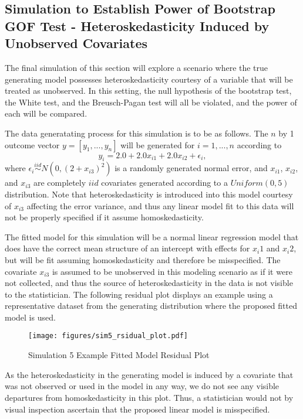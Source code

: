 		\subsection{Simulation to Establish Power of Bootstrap GOF Test - Heteroskedasticity Induced by Unobserved Covariates}

		The final simulation of this section will explore a scenario where the true generating model possesses heteroskedasticity courtesy of a variable that will be
		treated as unobserved. In this setting, the null hypothesis of the bootstrap test, the White test, and the Breusch-Pagan test will all be violated, and the
		power of each will be compared.

		The data generatating process for this simulation is to be as follows. The $n$ by 1 outcome vector $y = [y_1,...,y_n]$ will be generated for $i = 1,...,n$ according
		to
		\begin{equation}
			y_i = 2.0 + 2.0 x_{i1} + 2.0 x_{i2} + \epsilon_i , 
		\end{equation}
		where $\epsilon_i \stackrel{iid}{\sim} N \left( 0,(2 + x_{i3})^2 \right)$ is a randomly generated normal error, and $x_{i1}$, $x_{i2}$, and $x_{i3}$ are completely $iid$ covariates
		generated according to a $Uniform(0,5)$ distribution. Note that heteroskedasticity is introduced into this model courtesy of $x_{i3}$ affecting the error variance, and thus any
		linear model fit to this data will not be properly specified if it assume homoskedasticity.
		
		The fitted model for this simulation will be a normal linear regression model that does have the correct mean structure of an intercept with effects for $x_i1$ and $x_i2$, but will
		be fit assuming homoskedasticity and therefore be misspecified. The covariate $x_{i3}$ is assumed to be unobserved in this modeling scenario as if it were not collected, and thus the
		source of heteroskedasticity in the data is not visible to the statistician. The following residual plot displays an example using a representative dataset from the generating distribution
		where the proposed fitted model is used.

		\begin{figure}[H]
			\centering
			\captionsetup{justification=centering}
			\texttt{[image: figures/sim5\_rsidual\_plot.pdf]}
			\caption{\label{fig:sim5_residual_plot} Simulation 5 Example Fitted Model Residual Plot}
		\end{figure}

		As the heteroskedasticity in the generating model is induced by a covariate that was not observed or used in the model in any way, we do not see any visible departures from
		homoskedasticity in this plot. Thus, a statistician would not by visual inspection ascertain that the proposed linear model is misspecified. 

